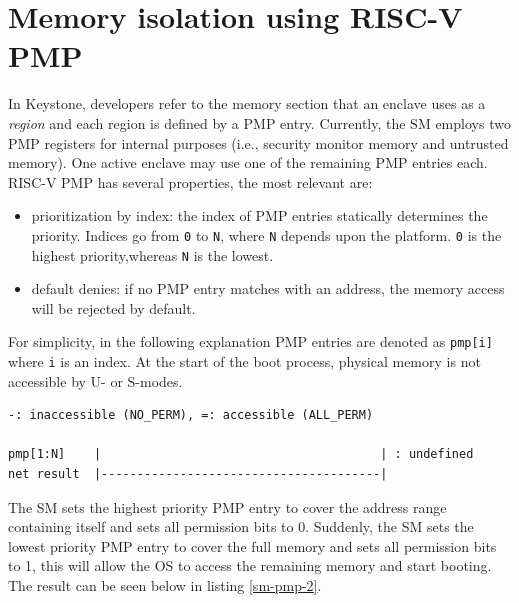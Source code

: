 \section{Memory isolation using RISC-V PMP}
In Keystone, developers refer to the memory section that an enclave uses as a \textit{region} and each region is defined by a PMP entry. Currently, the SM employs two PMP registers for internal purposes (i.e., security monitor memory and untrusted memory). One active enclave may use one of the remaining PMP entries each. RISC-V PMP has several properties, the most relevant are: 
\begin{itemize}
    \item prioritization by index: the index of PMP entries statically determines the priority. Indices go from \texttt{0} to \texttt{N}, where \texttt{N} depends upon the platform. \texttt{0} is the highest priority,whereas \texttt{N} is the lowest. 
    \item default denies: if no PMP entry matches with an address, the memory access will be rejected by default.
\end{itemize}
For simplicity, in the following explanation PMP entries are denoted as \texttt{pmp[i]} where \texttt{i} is an index. At the start of the boot process, physical memory is not accessible by U- or S-modes. \\

\begin{lstlisting}[frame=single,showspaces=true,caption={Memory state when booting start \cite{keystone-doc}},captionpos=b,label={sm-pmp-1}]
-: inaccessible (NO_PERM), =: accessible (ALL_PERM)

pmp[1:N]    |                                       | : undefined
net result  |---------------------------------------|   
\end{lstlisting}
\noindent
The SM sets the highest priority PMP entry to cover the address range containing itself and sets all permission bits to 0. Suddenly, the SM sets the lowest priority PMP entry to cover the full memory and sets all permission bits to 1, this will allow the OS to access the remaining memory and start booting. The result can be seen below in listing \ref{sm-pmp-2}. \\

